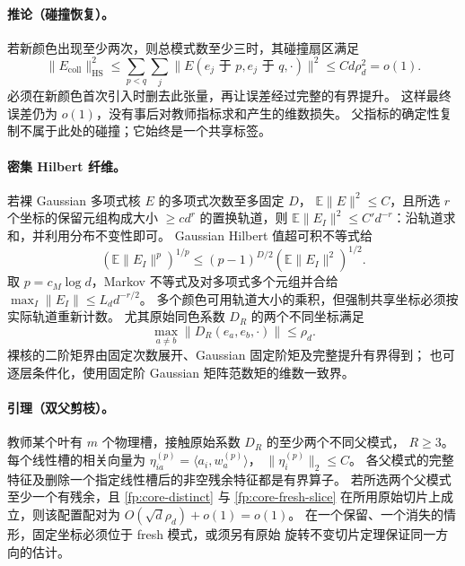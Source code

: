 \documentclass[a4paper]{tufte-handout}
\begin{document}
\begin{fullwidth}
\paragraph{推论（碰撞恢复）。}
\label{fp:core-collision}
若新颜色出现至少两次，则总模式数至少三时，其碰撞扇区满足
\begin{equation}
 \|E_{\mathrm{coll}}\|_{\mathrm{HS}}^2
 \leq\sum_{p<q}\sum_j\|E(e_j\text{ 于 }p,e_j\text{ 于 }q,\cdot)\|^2
 \leq C d\rho_d^2=o(1).
 \label{fp:core-collision-bound}
\end{equation}
必须在新颜色首次引入时删去此张量，再让误差经过完整的有界提升。
这样最终误差仍为 $o(1)$，没有事后对教师指标求和产生的维数损失。
父指标的确定性复制不属于此处的碰撞；它始终是一个共享标签。

\paragraph{密集 Hilbert 纤维。}
\label{fp:core-dense}
若裸 Gaussian 多项式核 $E$ 的多项式次数至多固定 $D$，
$\mathbb E\|E\|^2\leq C$，且所选 $r$ 个坐标的保留元组构成大小
$\geq c d^r$ 的置换轨道，则
$\mathbb E\|E_I\|^2\leq C'd^{-r}$：沿轨道求和，并利用分布不变性即可。
Gaussian Hilbert 值超可积不等式给
\[
 (\mathbb E\|E_I\|^p)^{1/p}
 \leq(p-1)^{D/2}(\mathbb E\|E_I\|^2)^{1/2}.
\]
取 $p=c_M\log d$，Markov 不等式及对多项式多个元组并合给
$\max_I\|E_I\|\leq L_dd^{-r/2}$。
多个颜色可用轨道大小的乘积，但强制共享坐标必须按实际轨道重新计数。
尤其原始同色系数 $D_R$ 的两个不同坐标满足
\begin{equation}
 \max_{a\ne b}\|D_R(e_a,e_b,\cdot)\|\leq\rho_d.
 \label{fp:core-distinct}
\end{equation}
裸核的二阶矩界由固定次数展开、Gaussian 固定阶矩及完整提升有界得到；
也可逐层条件化，使用固定阶 Gaussian 矩阵范数矩的维数一致界。

\paragraph{引理（双父剪枝）。}
\label{fp:core-two-parent}
教师某个叶有 $m$ 个物理槽，接触原始系数 $D_R$ 的至少两个不同父模式，
$R\geq3$。每个线性槽的相关向量为
$\eta^{(p)}_{ia}=\langle a_i,w_a^{(p)}\rangle$，
$\|\eta_i^{(p)}\|_2\leq C$。
各父模式的完整特征及删除一个指定线性槽后的非空残余特征都是有界算子。
若所选两个父模式至少一个有残余，且 \eqref{fp:core-distinct} 与
\eqref{fp:core-fresh-slice} 在所用原始切片上成立，则该配置配对为
$O(\sqrt d\rho_d)+o(1)=o(1)$。
在一个保留、一个消失的情形，固定坐标必须位于 fresh 模式，或须另有原始
旋转不变切片定理保证同一方向的估计。


\end{fullwidth}
\end{document}
